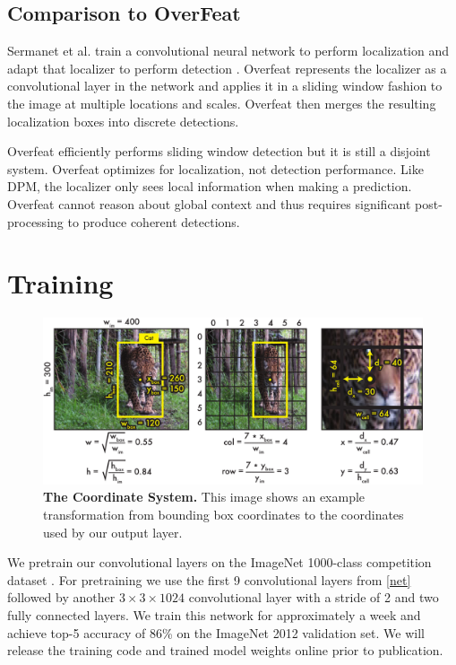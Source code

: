 \documentclass{article} %
\begin{document}
\subsection{Comparison to OverFeat}

Sermanet et al. train a convolutional neural network to perform localization and adapt that localizer to perform detection \cite{DBLP:journals/corr/SermanetEZMFL13}. Overfeat represents the localizer as a convolutional layer in the network and applies it in a sliding window fashion to the image at multiple locations and scales. Overfeat then merges the resulting localization boxes into discrete detections.

Overfeat efficiently performs sliding window detection but it is still a disjoint system. Overfeat optimizes for localization, not detection performance. Like DPM, the localizer only sees local information when making a prediction. Overfeat cannot reason about global context and thus requires significant post-processing to produce coherent detections.

\section{Training}

   \begin{figure}[t]
      \centering
        \includegraphics[width=.8\linewidth]{transform}
      \caption{\textbf{The Coordinate System.} This image shows an example transformation from bounding box coordinates to the coordinates used by our output layer.}
      \label{transform}
   \end{figure}


We pretrain our convolutional layers on the ImageNet 1000-class competition dataset \cite{ILSVRC15}. For pretraining we use the first 9 convolutional layers from \ref{net} followed by another $3 \times 3 \times 1024$ convolutional layer with a stride of 2 and two fully connected layers. We train this network for approximately a week and achieve top-5 accuracy of 86\% on the ImageNet 2012 validation set. We will release the training code and trained model weights online prior to publication.
\end{document}
